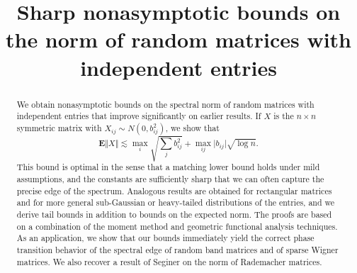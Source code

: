 \documentclass[aop,MSNbibl,dvips]{arximspdf}
\newcommand{\rrvert}{\vert}
\newcommand{\rrVert}{\Vert}
\newcommand{\llvert}{\vert}
\newcommand{\llVert}{\Vert}
\begin{document}
%
\begin{frontmatter}

\title{Sharp nonasymptotic bounds on the norm of random matrices with
independent entries}

%

%
%

%
\begin{abstract}
We obtain nonasymptotic bounds on the spectral norm of random
matrices with independent entries that improve significantly on earlier
results. If $X$ is the $n\times n$ symmetric
matrix with $X_{ij}\sim N(0,b_{ij}^2)$, we show that
%
\[
\mathbf{E}\llVert X\rrVert\lesssim\max_i\sqrt{
\sum_{j}b_{ij}^2} + \max
_{ij}\llvert b_{ij}\rrvert\sqrt{\log n}.
\]
%
This bound is optimal in the sense that a matching lower bound holds under
mild assumptions, and the constants are sufficiently sharp that we can
often capture the precise edge of the spectrum. Analogous
results are obtained for rectangular matrices and for more general
sub-Gaussian or heavy-tailed distributions of the entries, and we derive
tail bounds in addition to bounds on the expected norm. The proofs are
based on a combination of the moment method and geometric functional
analysis techniques.
As an application, we show that our bounds immediately yield the correct
phase transition behavior of the spectral edge of random band matrices and
of sparse Wigner matrices. We also recover a result of Seginer on
the norm of Rademacher matrices.
\end{abstract}


\end{frontmatter}
\end{document}
